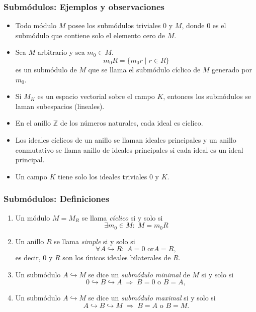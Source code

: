 \documentclass[notes=show]{beamer}%
\begin{document}
\begin{frame}
    \frametitle{Submódulos: Ejemplos y observaciones}
    \begin{itemize}
        \item Todo módulo \( M \) posee los submódulos triviales \( 0 \) y \( M \), donde \( 0 \) es el submódulo 
        que contiene solo el elemento cero de \( M \).
        \item Sea \( M \) arbitrario y sea \( m_0 \in M \).
        \[
        m_0R = \{m_0r \mid r \in R\}
        \]
        es un submódulo de \( M \) que se llama el submódulo cíclico de \( M \) generado por \( m_0 \).
        \item Si \( M_K \) es un espacio vectorial sobre el campo \( K \), entonces los submódulos se 
        laman subespacios (lineales).
        \item En el anillo \( \mathbb{Z} \) de los números naturales, cada ideal es cíclico.
        \item Los ideales cíclicos de un anillo se llaman ideales principales y un anillo conmutativo se 
        llama anillo de ideales principales si cada ideal es un ideal principal.
        \item Un campo \( K \) tiene solo los ideales triviales \( 0 \) y \( K \).
    \end{itemize}
\end{frame}

\begin{frame}
    \frametitle{Submódulos: Definiciones}
    \begin{enumerate}
        \item Un módulo \( M = M_R \) se llama \textit{cíclico} si y solo si
        \[ \exists m_0 \in M : \; M = m_0R \]
        \item Un anillo \( R \) se llama \textit{simple} si y solo si
        \[
        \forall A \hookrightarrow R: \; A = 0 \text{ or} A = R,
        \]
        es decir, \( 0 \) y \( R \) son los únicos ideales bilaterales de \( R \).
        \item Un submódulo \( A \hookrightarrow M \) se dice un \textit{submódulo minimal} de \( M \) si y solo si
        \[
        0 \hookrightarrow B \hookrightarrow A \;\Rightarrow\; B = 0 \text{ o } B = A,
        \]
        \item Un submódulo \( A \hookrightarrow M \) se dice un \textit{submódulo maximal} si y solo si
     \[
            A \hookrightarrow B \hookrightarrow M \;\Rightarrow\; B = A \text{ o } B = M.
            \]
    \end{enumerate}
\end{frame}
\end{document}

